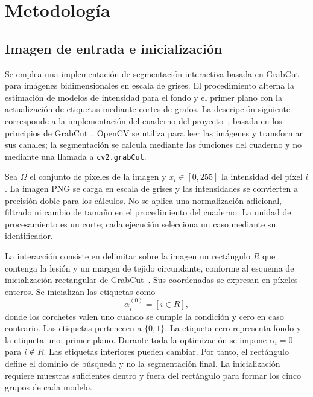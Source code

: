\section{Metodología}
\label{sec:metodologia}

\subsection{Imagen de entrada e inicialización}

Se emplea una implementación de segmentación interactiva basada en GrabCut
para imágenes bidimensionales en escala de grises. El procedimiento alterna
la estimación de modelos de intensidad para el fondo y el primer plano con
la actualización de etiquetas mediante cortes de grafos. La descripción
siguiente corresponde a la implementación del cuaderno del
proyecto~\cite{cuaderno}, basada en los principios de GrabCut~\cite{rother2004}.
OpenCV se utiliza para leer las imágenes y transformar sus canales; la
segmentación se calcula mediante las funciones del cuaderno y no mediante
una llamada a \texttt{cv2.grabCut}.

Sea $\Omega$ el conjunto de píxeles de la imagen y $x_i\in[0,255]$ la
intensidad del píxel $i$. La imagen PNG se carga en escala de grises y las
intensidades se convierten a precisión doble para los cálculos. No se aplica
una normalización adicional, filtrado ni cambio de tamaño en el procedimiento
del cuaderno. La unidad de procesamiento es un corte; cada ejecución
selecciona un caso mediante su identificador.

La interacción consiste en delimitar sobre la imagen un rectángulo $R$
que contenga la lesión y un margen de tejido circundante, conforme al
esquema de inicialización rectangular de GrabCut~\cite{rother2004}. Sus coordenadas
se expresan en píxeles enteros. Se inicializan las etiquetas como
\begin{equation}
 \alpha_i^{(0)}=[i\in R],
 \label{eq:inicializacion}
\end{equation}
donde los corchetes valen uno cuando se cumple la condición y cero en caso
contrario. Las etiquetas pertenecen a $\{0,1\}$. La etiqueta cero representa fondo y la etiqueta uno, primer
plano. Durante toda la optimización se impone $\alpha_i=0$ para
$i\notin R$. Las etiquetas interiores pueden cambiar. Por tanto, el
rectángulo define el dominio de búsqueda y no la segmentación final. La
inicialización requiere muestras suficientes dentro y fuera del rectángulo
para formar los cinco grupos de cada modelo.

